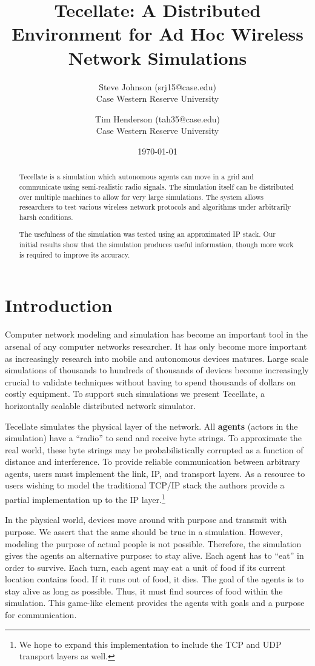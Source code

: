 \documentclass[12pt]{article}
\title{Tecellate: A Distributed Environment for Ad Hoc Wireless Network Simulations}
\author{
        Steve Johnson (srj15@case.edu)\\
        Case Western Reserve University\\
        \and Tim Henderson (tah35@case.edu)\\
        Case Western Reserve University
}
\date{\today}
\begin{document}
\doublespacing
\maketitle


\begin{abstract}
    Tecellate is a simulation which autonomous agents can move in a grid and communicate using
    semi-realistic radio signals. The simulation itself can be distributed over multiple machines to
    allow for very large simulations. The system allows researchers to test various wireless network
    protocols and algorithms under arbitrarily harsh conditions.
    
    The usefulness of the simulation was tested using an approximated IP stack. Our initial results
    show that the simulation produces useful information, though more work is required to improve
    its accuracy.
\end{abstract}

\section{Introduction}

Computer network modeling and simulation has become an important tool in the arsenal of any computer
networks researcher. It has only become more important as increasingly research into mobile
and autonomous devices matures. Large scale simulations of thousands to hundreds of thousands of
devices become increasingly crucial to validate techniques without having to spend thousands of
dollars on costly equipment. To support such simulations we present Tecellate, a horizontally
scalable distributed network simulator.

Tecellate simulates the physical layer of the network. All \textbf{agents} (actors in the
simulation) have a ``radio'' to send and receive byte strings. To approximate the real world, these
byte strings may be probabilistically corrupted as a function of distance and interference. To
provide reliable communication between arbitrary agents, users must implement the link, IP, and
transport layers. As a resource to users wishing to model the traditional TCP/IP stack the authors
provide a partial implementation up to the IP layer.\footnote{
  We hope to expand this implementation to include the TCP and UDP transport layers as well.
}

In the physical world, devices move around with purpose and transmit with purpose. We assert that
the same should be true in a simulation. However, modeling the purpose of actual people is not
possible. Therefore, the simulation gives the agents an alternative purpose: to stay alive. Each
agent has to ``eat'' in order to survive. Each turn, each agent may eat a unit of food if its
current location contains food. If it runs out of food, it dies. The goal of the agents is to stay
alive as long as possible. Thus, it must find sources of food within the simulation. This game-like
element provides the agents with goals and a purpose for communication.
\end{document}
